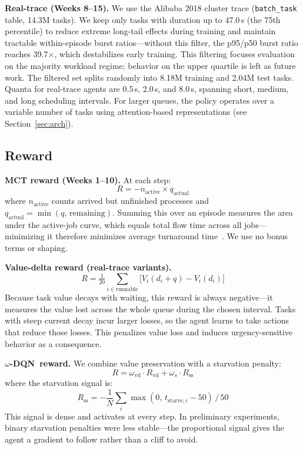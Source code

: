 \documentclass[10pt,twocolumn]{article}
\theoremstyle{remark}
\newcommand{\omegadqn}{$\omega$-DQN}
\begin{document}
\textbf{Real-trace (Weeks 8--15).} We use the Alibaba 2018 cluster
trace (\texttt{batch\_task} table, 14.3M tasks). We keep only tasks
with duration up to 47.0\,s (the 75th percentile) to reduce extreme
long-tail effects during training and maintain tractable
within-episode burst ratios---without this filter, the p95/p50 burst
ratio reaches 39.7$\times$, which destabilizes early training. This
filtering focuses evaluation on the majority workload regime;
behavior on the upper quartile is left as future work. The filtered
set splits randomly into 8.18M training and 2.04M test tasks. Quanta
for real-trace agents are 0.5\,s, 2.0\,s, and 8.0\,s, spanning
short, medium, and long scheduling intervals. For larger queues, the
policy operates over a variable number of tasks using
attention-based representations (see Section~\ref{sec:arch}).

\subsection{Reward}

\textbf{MCT reward (Weeks 1--10).} At each step:
\begin{equation}
  R = -n_{\mathrm{active}} \times q_{\mathrm{actual}}
\end{equation}
where $n_{\mathrm{active}}$ counts arrived but unfinished processes
and $q_{\mathrm{actual}}=\min(q,\,\mathrm{remaining})$. Summing
this over an episode measures the area under the active-job curve,
which equals total flow time across all jobs---minimizing it
therefore minimizes average turnaround time~\cite{littlesLaw}. We
use no bonus terms or shaping.

\textbf{Value-delta reward (real-trace variants).}
\begin{equation}
  R = \tfrac{1}{20}\sum_{i\in\mathrm{runnable}}
  \bigl[V_i(d_i+q) - V_i(d_i)\bigr]
\end{equation}
Because task value decays with waiting, this reward is always
negative---it measures the value lost across the whole queue during
the chosen interval. Tasks with steep current decay incur larger
losses, so the agent learns to take actions that reduce those losses.
This penalizes value loss and induces urgency-sensitive behavior as a
consequence.

\textbf{\omegadqn\ reward.} We combine value preservation with a
starvation penalty:
\begin{equation}
  R = \omega_{\mathrm{vd}} \cdot R_{\mathrm{vd}}
  + \omega_s \cdot R_{\mathrm{ss}}
\end{equation}
where the starvation signal is:
\begin{equation}
  R_{\mathrm{ss}} = -\frac{1}{N}\sum_i
  \max(0,\, t_{\mathrm{starve},i} - 50)\,/\,50
\end{equation}
This signal is dense and activates at every step. In preliminary
experiments, binary starvation penalties were less stable---the
proportional signal gives the agent a gradient to follow rather than
a cliff to avoid.
\end{document}
